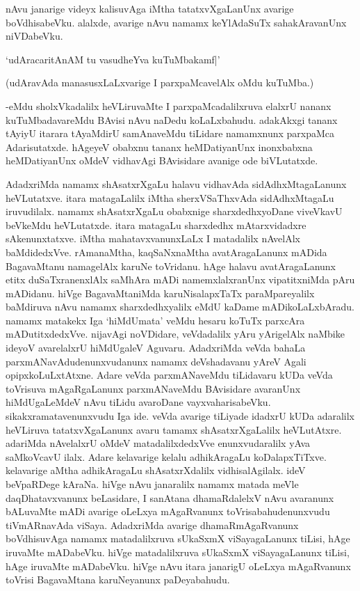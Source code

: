 nAvu janarige videyx kalisuvAga iMtha tatatxvXgaLanUnx avarige boVdhisabeVku. alalxde, avarige nAvu namamx keYlAdaSuTx sahakAravanUnx niVDabeVku.

\begin{shloka}
`udAracaritAnAM tu vasudheYva kuTuMbakamf|'
\end{shloka}

(udAravAda manasusxLaLxvarige I parxpaMcavelAlx oMdu kuTuMba.)

-eMdu sholxVkadalilx heVLiruvaMte I parxpaMcadalilxruva elalxrU nananx kuTuMbadavareMdu BAvisi nAvu naDedu koLaLxbahudu. adakAkxgi tananx tAyiyU itarara tAyaMdirU samAnaveMdu tiLidare namamxnunx parxpaMca Adarisutatxde. hAgeyeV obabxnu tananx heMDatiyanUnx inonxbabxna heMDatiyanUnx oMdeV vidhavAgi BAvisidare avanige ode biVLutatxde.

AdadxriMda namamx shAsatxrXgaLu halavu vidhavAda sidAdhxMtagaLanunx heVLutatxve. itara matagaLalilx iMtha sherxVSaThxvAda sidAdhxMtagaLu iruvudilalx. namamx shAsatxrXgaLu obabxnige sharxdedhxyoDane viveVkavU beVkeMdu heVLutatxde. itara matagaLu sharxdedhx mAtarxvidadxre sAkenunxtatxve. iMtha mahatavxvanunxLaLx I matadalilx nAvelAlx baMdidedxVve. rAmanaMtha, kaqSaNxnaMtha avatAragaLanunx mADida BagavaMtanu namagelAlx karuNe toVridanu. hAge halavu avatAragaLanunx etitx duSaTxranenxlAlx saMhAra mADi namemxlalxranUnx 
vipatitxniMda pAru mADidanu. hiVge BagavaMtaniMda karuNisalapxTaTx paraMpareyalilx baMdiruva nAvu namamx sharxdedhxyalilx eMdU kaDame mADikoLaLxbAradu. namamx matakekx Iga `hiMdUmata' veMdu hesaru koTuTx parxcAra mADutitxdedxVve. nijavAgi noVDidare, veVdadalilx yAru yArigelAlx naMbike ideyoV avarelalxrU hiMdUgaleV Aguvaru. AdadxriMda veVda bahaLa parxmANavAdudenunxvudanunx namamx deVshadavanu yAreV Agali opipxkoLuLxtAtxne. Adare veVda parxmANaveMdu tiLidavaru kUDa veVda toVrisuva mAgaRgaLanunx parxmANaveMdu BAvisidare 
avaranUnx hiMdUgaLeMdeV nAvu tiLidu avaroDane vayxvaharisabeVku. sikakxramatavenunxvudu Iga ide. veVda avarige tiLiyade idadxrU kUDa adaralilx heVLiruva tatatxvXgaLanunx avaru tamamx shAsatxrXgaLalilx heVLutAtxre. adariMda nAvelalxrU oMdeV matadalilxdedxVve enunxvudaralilx yAva saMkoVcavU ilalx. Adare kelavarige kelalu adhikAragaLu koDalapxTiTxve. kelavarige aMtha adhikAragaLu shAsatxrXdalilx vidhisalAgilalx. ideV beVpaRDege kAraNa. hiVge nAvu janaralilx namamx matada meVle daqDhatavxvanunx beLasidare, I sanAtana 
dhamaRdalelxV nAvu avaranunx bALuvaMte mADi avarige oLeLxya mAgaRvanunx toVrisabahudenunxvudu tiVmARnavAda viSaya. AdadxriMda avarige dhamaRmAgaRvanunx boVdhisuvAga namamx matadalilxruva sUkaSxmX viSayagaLanunx tiLisi, hAge iruvaMte mADabeVku. hiVge matadalilxruva sUkaSxmX viSayagaLanunx tiLisi, hAge iruvaMte mADabeVku. hiVge nAvu itara janarigU oLeLxya mAgaRvanunx toVrisi BagavaMtana karuNeyanunx paDeyabahudu.


\endchapter
